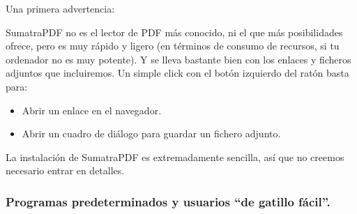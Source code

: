\documentclass[10pt,a4paper]{article}
\begin{document}
Una primera advertencia:
        \begin{center}
        \end{center}



SumatraPDF no es el lector de PDF más conocido, ni el que más posibilidades ofrece, pero es muy
rápido y ligero (en términos de consumo de recursos, si tu ordenador no es muy potente). Y se lleva
bastante bien con los enlaces y ficheros adjuntos que incluiremos. Un simple click con el botón
izquierdo del ratón basta para:
\begin{itemize}
  \item Abrir un enlace en el navegador.
  \item Abrir un cuadro de diálogo para guardar un fichero adjunto.
\end{itemize}
La instalación de SumatraPDF es extremadamente sencilla, así que no creemos necesario entrar en
detalles.

\subsubsection{Programas predeterminados y usuarios ``de gatillo fácil''.}
\end{document}
